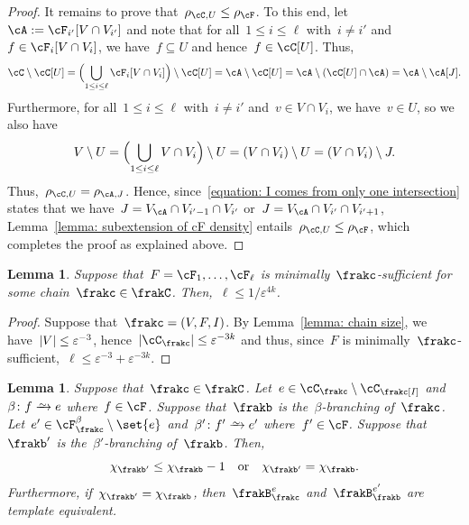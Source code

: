 \documentclass[11pt]{amsart}
\newcommand{\eps}{\varepsilon}
\DeclarePairedDelimiter{\paren}{\lparen}{\rparen}
\DeclarePairedDelimiter{\abs}{\lvert}{\rvert}
\newcommand{\qtor}{\quad\text{or}\quad}
\newcommand{\bijection}{\mathchoice
	{\xrightarrow{\smash{\raisebox{-3pt}{$\scriptstyle\sim$}}}}%
	{\xrightarrow{\smash{\raisebox{-3pt}{$\scriptstyle\sim$}}}}%
	{\xrightarrow{\smash{\raisebox{-2.5pt}{$\scriptscriptstyle\sim$}}}}%
	{\xrightarrow{\smash{\raisebox{-2.5pt}{$\scriptscriptstyle\sim$}}}}%
}
\newtheorem{lemma}[algocf]{Lemma}
\theoremstyle{definition}
\numberwithin{equation}{section}
\begin{document}
\begin{proof}
		It remains to prove that~$\rho_{\cC,U}\leq \rho_\cF$.	
		To this end, let~$\cA:=\cF_{i'}[V\cap V_{i'}]$ and note that for all~$1\leq i\leq\ell$ with~$i\neq i'$ and~$f\in\cF_i[V\cap V_i]$, we have~$f\subseteq U$ and hence~$f\in \cC[U]$.
		Thus,
		\begin{equation*}
			\cC\setminus\cC[U]
			=\paren[\Big]{ \bigcup_{1\leq i\leq \ell} \cF_i[V\cap V_i] }\setminus\cC[U]
			=\cA\setminus\cC[U]
			=\cA\setminus(\cC[U]\cap \cA)
			=\cA\setminus \cA[J].
		\end{equation*}
		Furthermore, for all~$1\leq i\leq \ell$ with~$i\neq i'$ and~$v\in V\cap V_i$, we have~$v\in U$, so we also have
		\begin{equation*}
			V\setminus U
			=\paren[\Big]{ \bigcup_{1\leq i\leq\ell} V\cap V_i }\setminus U
			=(V\cap V_i)\setminus U
			=(V\cap V_i)\setminus J.
		\end{equation*}
		Thus,~$\rho_{\cC,U}=\rho_{\cA,J}$.
		Hence, since~\eqref{equation: I comes from only one intersection} states that we have~$J=V_\cA\cap V_{i'-1}\cap V_{i'}$ or~$J=V_\cA\cap V_{i'}\cap V_{i'+1}$, Lemma~\ref{lemma: subextension of cF density} entails~$\rho_{\cC,U}\leq \rho_\cF$, which completes the proof as explained above.
	\end{proof}
	
	\begin{lemma}\label{lemma: minimally sufficient length}
		Suppose that~$F=\cF_1,\ldots,\cF_\ell$ is minimally~$\frakc$-sufficient for some chain~$\frakc\in\frakC$.
		Then,~$\ell\leq 1/\eps^{4k}$.
	\end{lemma}
	\begin{proof}
		Suppose that~$\frakc=(V,F,I)$.
		By Lemma~\ref{lemma: chain size}, we have~$\abs{V}\leq \eps^{-3}$, hence~$\abs{\cC_\frakc}\leq \eps^{-3k}$ and thus, since~$F$ is minimally~$\frakc$-sufficient,~$\ell\leq\eps^{-3}+\eps^{-3k}$.
	\end{proof}
	
	\begin{lemma}\label{lemma: error parameter property}
		Suppose that~$\frakc\in\frakC$.
		Let~$e\in\cC_\frakc\setminus\cC_\frakc[I]$ and~$\beta\colon f\bijection e$ where~$f\in\cF$.
		Suppose that~$\frakb$ is the~$\beta$-branching of~$\frakc$.
		Let~$e'\in \cF_\frakc^\beta\setminus\set{e}$ and~$\beta'\colon f'\bijection e'$ where~$f'\in\cF$.
		Suppose that~$\frakb'$ is the~$\beta'$-branching of~$\frakb$.
		Then,
		\begin{equation*}
			\chi_{\frakb'}\leq \chi_\frakb-1
			\qtor
			\chi_{\frakb'}= \chi_\frakb.
		\end{equation*}
		Furthermore, if~$\chi_{\frakb'}= \chi_\frakb$, then~$\frakB_\frakc^e$ and~$\frakB_{\frakb}^{e'}$ are template equivalent.
	\end{lemma}
	
\end{document}
